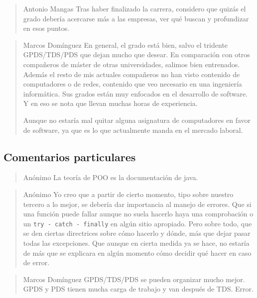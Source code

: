 \begin{quote}{Antonio Mangas}
    Tras haber finalizado la carrera,
    considero que quizás el grado debería acercarse más a las empresas,
    ver qué buscan y profundizar en esos puntos.
\end{quote}

\begin{quote}{Marcos Domínguez}\label{qte:marcos-contents}
    En general, el grado está bien,
    salvo el tridente GPDS/TDS/PDS que dejan mucho que desear.
    En comparación con otros compañeros de máster de otras universidades,
    salimos bien entrenados.
    Además el resto de mis actuales compañeros no han visto
    contenido de computadores o de redes,
    contenido que veo necesario en una ingeniería informática.
    Sus grados están muy enfocados en el desarrollo de software.
    Y en eso se nota que llevan muchas horas de experiencia.

    Aunque no estaría mal quitar alguna asignatura de computadores
    en favor de software,
    ya que es lo que actualmente manda en el mercado laboral.
\end{quote}

\subsection{Comentarios particulares}

\begin{quote}{Anónimo}
    La teoría de POO es la documentación de java.
\end{quote}

\begin{quote}{Anónimo}
    Yo creo que a partir de cierto momento,
    tipo sobre nuestro tercero a lo mejor,
    se debería dar importancia al manejo de errores.
    Que si una función puede fallar aunque no suela hacerlo
    haya una comprobación o un \lstinline{try - catch - finally}
    en algún sitio apropiado.
    Pero sobre todo, que se den ciertas directrices sobre cómo hacerlo y dónde,
    más que dejar pasar todas las excepciones.
    Que aunque en cierta medida ya se hace, no estaría de más que
    se explicara en algún momento cómo decidir qué hacer en caso de error.
\end{quote}

\begin{quote}{Marcos Domínguez}
    GPDS/TDS/PDS se pueden organizar mucho mejor.
    GPDS y PDS tienen mucha carga de trabajo y van después de TDS.
    Error.
\end{quote}

